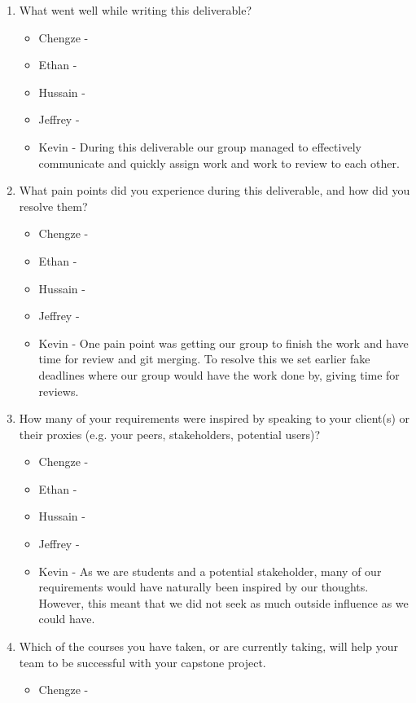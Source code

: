 \begin{enumerate}
  \item What went well while writing this deliverable?
  \begin{itemize}
        \item Chengze - 
        \item Ethan - 
        \item Hussain - 
        \item Jeffrey - 
        \item Kevin - During this deliverable our group managed to effectively communicate and quickly assign work and work to review to each other. 
  \end{itemize} 
  \item What pain points did you experience during this deliverable, and how did
  you resolve them?
  \begin{itemize}
        \item Chengze - 
        \item Ethan - 
        \item Hussain - 
        \item Jeffrey - 
        \item Kevin - One pain point was getting our group to finish the work and have time for review and git merging. To resolve this we set earlier fake deadlines where our group would have the work done by, giving time for reviews. 
  \end{itemize} 
  \item How many of your requirements were inspired by speaking to your
  client(s) or their proxies (e.g. your peers, stakeholders, potential users)?
  \begin{itemize}
        \item Chengze - 
        \item Ethan - 
        \item Hussain - 
        \item Jeffrey - 
        \item Kevin - As we are students and a potential stakeholder, many of our requirements would have naturally been inspired by our thoughts. However, this meant that we did not seek as much outside influence as we could have. 
  \end{itemize} 
  \item Which of the courses you have taken, or are currently taking, will help
  your team to be successful with your capstone project.
  \begin{itemize}
        \item Chengze - 

\end{itemize}
\end{enumerate}
